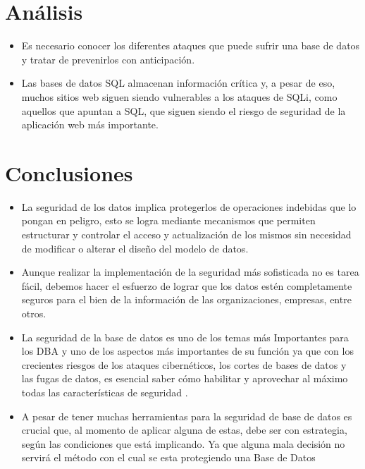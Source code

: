 \documentclass[%
 reprint,
 amsmath,amssymb,
 aps,
]{revtex4-1}
\begin{document}
\section{Análisis}

\begin{itemize}
	\item Es necesario conocer los diferentes ataques que puede sufrir una base de datos y tratar de prevenirlos con anticipación. 
	\item Las bases de datos SQL almacenan información crítica y, a pesar de eso, muchos sitios web siguen siendo vulnerables a los ataques de SQLi, como aquellos que apuntan a SQL, que siguen siendo el riesgo de seguridad de la aplicación web más importante.
\end{itemize}
\section{Conclusiones}

\begin{itemize}
	\item La seguridad de los datos implica protegerlos de operaciones indebidas que lo pongan en peligro, esto se logra mediante mecanismos que permiten estructurar y controlar el acceso y actualización de los mismos sin necesidad de modificar o alterar el diseño del modelo de datos.
	\item Aunque realizar la implementación de la seguridad más sofisticada no es tarea fácil, debemos hacer el esfuerzo de lograr que los datos estén completamente seguros para el bien de la información de las organizaciones, empresas, entre otros.
           \item La seguridad de la base de datos es uno de los temas más Importantes para los DBA y uno de los aspectos más importantes de su función ya que  con los crecientes riesgos de los ataques cibernéticos, los cortes de bases de datos y las fugas de datos, es esencial saber cómo habilitar y aprovechar al máximo todas las características de seguridad .
           \item A pesar de tener muchas herramientas para la seguridad de base de datos es crucial que, al momento de aplicar alguna de estas, debe ser con estrategia, según las condiciones que está implicando. Ya que alguna mala decisión no servirá el método con el cual se esta protegiendo una Base de Datos
\end{itemize}





\end{document}
